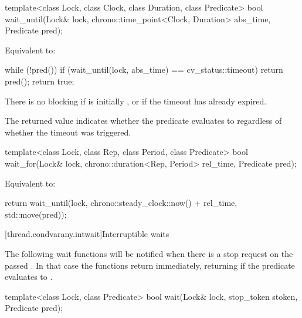 %
\begin{itemdecl}
template<class Lock, class Clock, class Duration, class Predicate>
  bool wait_until(Lock& lock, chrono::time_point<Clock, Duration> abs_time, Predicate pred);
\end{itemdecl}

\begin{itemdescr}
\pnum
\effects
Equivalent to:
\begin{codeblock}
while (!pred())
  if (wait_until(lock, abs_time) == cv_status::timeout)
    return pred();
return true;
\end{codeblock}

\pnum
\begin{note}
There is no blocking if  is initially , or
if the timeout has already expired.
\end{note}

\pnum
\begin{note}
The returned value indicates whether the predicate evaluates to 
regardless of whether the timeout was triggered.
\end{note}
\end{itemdescr}

%
\begin{itemdecl}
template<class Lock, class Rep, class Period, class Predicate>
  bool wait_for(Lock& lock, chrono::duration<Rep, Period> rel_time, Predicate pred);
\end{itemdecl}

\begin{itemdescr}
\pnum
\effects
Equivalent to:
\begin{codeblock}
return wait_until(lock, chrono::steady_clock::now() + rel_time, std::move(pred));
\end{codeblock}
\end{itemdescr}

[thread.condvarany.intwait]{Interruptible waits}

\pnum
The following wait functions will be notified
when there is a stop request on the passed .
In that case the functions return immediately,
returning  if the predicate evaluates to .

\begin{itemdecl}
template<class Lock, class Predicate>
  bool wait(Lock& lock, stop_token stoken, Predicate pred);
\end{itemdecl}

